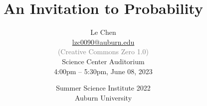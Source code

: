 


\title %
{
  An Invitation to Probability
}


\author{
  Le Chen\\
  {\small\url{lzc0090@auburn.edu}}\\[1em]
  \textcolor{gray}{\small (Creative Commons Zero 1.0)} \\[3em]
  {\small Science Center Auditorium}\\[1em]
  {\small 4:00pm -- 5:30pm, June 08, 2023}
}



\date[Auburn]{
  Summer Science Institute 2022\\
  Auburn University
}


